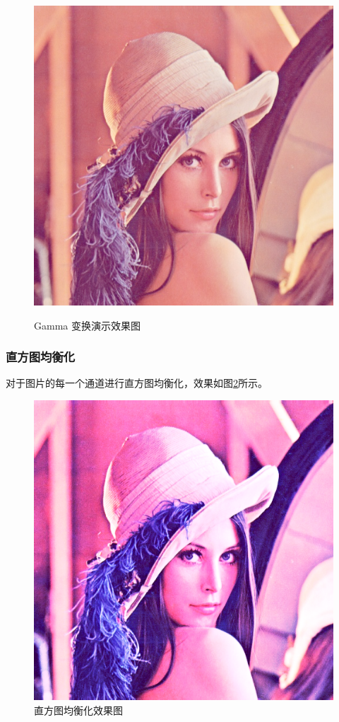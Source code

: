 \documentclass[a4paper]{article}
\begin{document}
\begin{figure}[htp]
{\begin{minipage}[b]{0.45\columnwidth}
{\includegraphics[width=1\columnwidth]{1_7.png}
}
\label{fig:1-4:b}
\end{minipage}
}
\caption{Gamma 变换演示效果图}
\label{fig:1-4}
\end{figure}

\subsubsection{直方图均衡化}

对于图片的每一个通道进行直方图均衡化，效果如图\ref{fig:1-5}所示。

\begin{figure}[htp]
\centering
\includegraphics[width=0.45\linewidth]{1_8.png}
\caption{直方图均衡化效果图}
\label{fig:1-5}
\end{figure}
\end{document}
